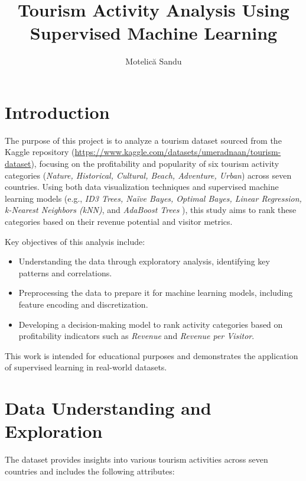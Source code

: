 \documentclass{article}
\title{Tourism Activity Analysis Using Supervised Machine Learning}
\author{Motelică Sandu}
\begin{document}
\maketitle

\section{Introduction}
The purpose of this project is to analyze a tourism dataset sourced from the Kaggle repository (\url{https://www.kaggle.com/datasets/umeradnaan/tourism-dataset}), focusing on the profitability and popularity of six tourism activity categories (\textit{Nature, Historical, Cultural, Beach, Adventure, Urban}) across seven countries. Using both data visualization techniques and supervised machine learning models (e.g., \textit{ID3 Trees, Na\"{i}ve Bayes, Optimal Bayes, Linear Regression,  k-Nearest Neighbors (kNN)}, and \textit{AdaBoost Trees} ), this study aims to rank these categories based on their revenue potential and visitor metrics.

Key objectives of this analysis include:
\begin{itemize}
    \item Understanding the data through exploratory analysis, identifying key patterns and correlations.
    \item Preprocessing the data to prepare it for machine learning models, including feature encoding and discretization.
    \item Developing a decision-making model to rank activity categories based on profitability indicators such as \textit{Revenue} and \textit{Revenue per Visitor}.
\end{itemize}

This work is intended for educational purposes and demonstrates the application of supervised learning in real-world datasets.

\section{Data Understanding and Exploration}
The dataset provides insights into various tourism activities across seven countries and includes the following attributes:
\end{document}
